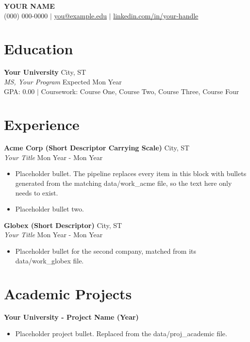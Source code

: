 \documentclass[a4paper,10pt]{article}
\begin{document}
\begin{center}
    {\Huge \textbf{YOUR NAME}} \\ \vspace{4pt}
    (000) 000-0000 $|$ \href{mailto:you@example.edu}{you@example.edu} $|$ \href{https://linkedin.com/in/your-handle}{linkedin.com/in/your-handle}
\end{center}

\vspace{5pt}

\section{Education}
\noindent \textbf{Your University} \hfill City, ST \\
\textit{MS, Your Program} \hfill Expected Mon Year \\
GPA: 0.00 $|$ Coursework: Course One, Course Two, Course Three, Course Four

\section{Experience}
\noindent \textbf{Acme Corp (Short Descriptor Carrying Scale)} \hfill City, ST \\
\textit{Your Title} \hfill Mon Year - Mon Year
\begin{itemize}
    \item Placeholder bullet. The pipeline replaces every item in this block with bullets generated from the matching data/work\_acme file, so the text here only needs to exist.
    \item Placeholder bullet two.
\end{itemize}

\vspace{6pt}

\noindent \textbf{Globex (Short Descriptor)} \hfill City, ST \\
\textit{Your Title} \hfill Mon Year - Mon Year
\begin{itemize}
    \item Placeholder bullet for the second company, matched from its data/work\_globex file.
\end{itemize}

\section{Academic Projects}
\noindent \textbf{Your University - Project Name (Year)}
\begin{itemize}
    \item Placeholder project bullet. Replaced from the data/proj\_academic file.
\end{itemize}
\end{document}
